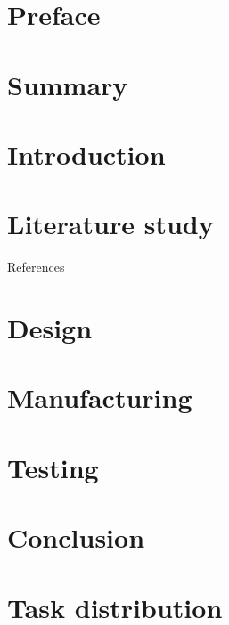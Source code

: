 \documentclass[a4paper, twoside, 12pt]{report}
\begin{document}

\chapter*{Preface}\label{ch:Preface}



\chapter*{Summary}\label{ch:Summary}



\chapter{Introduction}\label{ch:Introduction}



\chapter{Literature study}\label{ch:Literature study}

References \cite{knuth1984, lesk1977}


\chapter{Design}\label{ch:Design}



\chapter{Manufacturing}\label{ch:Manufacturing}



\chapter{Testing}\label{ch:Testing}



\chapter{Conclusion}\label{ch:Conclusion}


\newpage

\appendix
\chapter{Task distribution}
\end{document}
